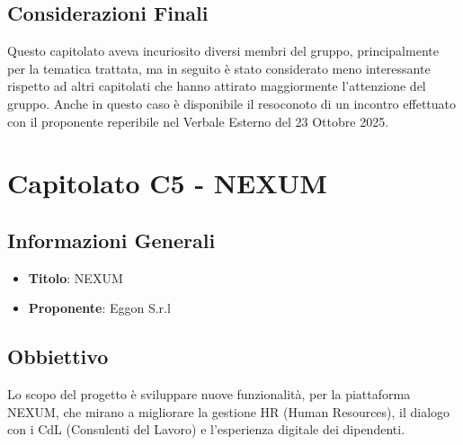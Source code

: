 \documentclass[a4paper,12pt]{article}
\begin{document}
    \subsection{Considerazioni Finali}
    Questo capitolato aveva incuriosito diversi membri del gruppo, principalmente per la tematica trattata, ma in seguito è stato considerato meno interessante rispetto ad altri capitolati che hanno attirato maggiormente l’attenzione del gruppo. Anche in questo caso è disponibile il resoconoto di un incontro effettuato con il proponente reperibile nel Verbale Esterno del 23 Ottobre 2025.

    \section{Capitolato C5 - NEXUM}
    \subsection{Informazioni Generali}
        \begin{itemize}
            \item \textbf{Titolo}: NEXUM
            \item \textbf{Proponente}: Eggon S.r.l
        \end{itemize}
    \subsection{Obbiettivo}
    Lo scopo del progetto è sviluppare nuove funzionalità, per la piattaforma NEXUM, che mirano a migliorare la gestione HR (Human Resources), il dialogo con i CdL (Consulenti del Lavoro) e l’esperienza digitale dei dipendenti.
\end{document}
